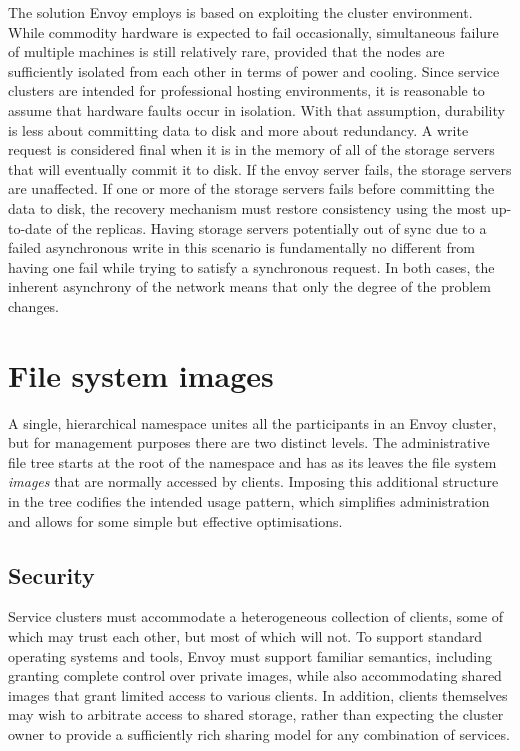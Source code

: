 The solution Envoy employs is based on exploiting the cluster environment. While commodity hardware is expected to fail occasionally, simultaneous failure of multiple machines is still relatively rare, provided that the nodes are sufficiently isolated from each other in terms of power and cooling. Since service clusters are intended for professional hosting environments, it is reasonable to assume that hardware faults occur in isolation. With that assumption, durability is less about committing data to disk and more about redundancy. A write request is considered final when it is in the memory of all of the storage servers that will eventually commit it to disk. If the envoy server fails, the storage servers are unaffected. If one or more of the storage servers fails before committing the data to disk, the recovery mechanism must restore consistency using the most up-to-date of the replicas. Having storage servers potentially out of sync due to a failed asynchronous write in this scenario is fundamentally no different from having one fail while trying to satisfy a synchronous request. In both cases, the inherent asynchrony of the network means that only the degree of the problem changes.

\section{File system images}

A single, hierarchical namespace unites all the participants in an Envoy cluster, but for management purposes there are two distinct levels. The administrative file tree starts at the root of the namespace and has as its leaves the file system \emph{images} that are normally accessed by clients. Imposing this additional structure in the tree codifies the intended usage pattern, which simplifies administration and allows for some simple but effective optimisations.

\subsection{Security}

Service clusters must accommodate a heterogeneous collection of clients, some of which may trust each other, but most of which will not. To support standard operating systems and tools, Envoy must support familiar semantics, including granting complete control over private images, while also accommodating shared images that grant limited access to various clients. In addition, clients themselves may wish to arbitrate access to shared storage, rather than expecting the cluster owner to provide a sufficiently rich sharing model for any combination of services.

